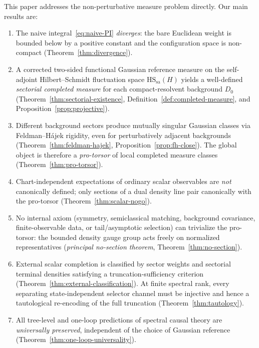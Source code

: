 \documentclass[12pt,a4paper]{article}
\theoremstyle{plain}
\theoremstyle{definition}
\theoremstyle{remark}
\newcommand{\HS}{\mathrm{HS}}
\newcommand{\sa}{\mathrm{sa}}
\begin{document}
This paper addresses the non-perturbative measure problem directly.  Our
main results are:
\begin{enumerate}[leftmargin=2em]
  \item The naive integral~\eqref{eq:naive-PI} \emph{diverges}: the bare
    Euclidean weight is bounded below by a positive constant and the
    configuration space is non-compact (Theorem~\ref{thm:divergence}).

  \item A corrected two-sided functional Gaussian reference measure on
    the self-adjoint Hilbert--Schmidt fluctuation space $\HS_\sa(H)$
    yields a well-defined \emph{sectorial completed measure} for each
    compact-resolvent background $D_0$
    (Theorem~\ref{thm:sectorial-existence}, Definition~\ref{def:completed-measure},
    and Proposition~\ref{prop:projective}).

  \item Different background sectors produce mutually singular Gaussian
    classes via Feldman--H\'ajek rigidity, even for perturbatively
    adjacent backgrounds
    (Theorem~\ref{thm:feldman-hajek},
    Proposition~\ref{prop:fh-close}).  The global object is therefore a
    \emph{pro-torsor} of local completed measure classes
    (Theorem~\ref{thm:pro-torsor}).

  \item Chart-independent expectations of ordinary scalar observables
    are \emph{not} canonically defined; only sections of a dual
    density line pair canonically with the pro-torsor
    (Theorem~\ref{thm:scalar-nogo}).

  \item No internal axiom (symmetry, semiclassical matching,
    background covariance, finite-observable data, or tail/asymptotic
    selection) can trivialize the pro-torsor: the bounded density gauge
    group acts freely on normalized representatives
    (\emph{principal no-section theorem},
    Theorem~\ref{thm:no-section}).

  \item External scalar completion is classified by sector weights and
    sectorial terminal densities satisfying a truncation-sufficiency
    criterion (Theorem~\ref{thm:external-classification}).
    At finite spectral rank, every separating state-independent
    selector channel must be injective and hence a tautological
    re-encoding of the full truncation
    (Theorem~\ref{thm:tautology}).

  \item All tree-level and one-loop predictions of spectral causal
    theory are \emph{universally preserved}, independent of the choice
    of Gaussian reference (Theorem~\ref{thm:one-loop-universality}).
\end{enumerate}
\end{document}
